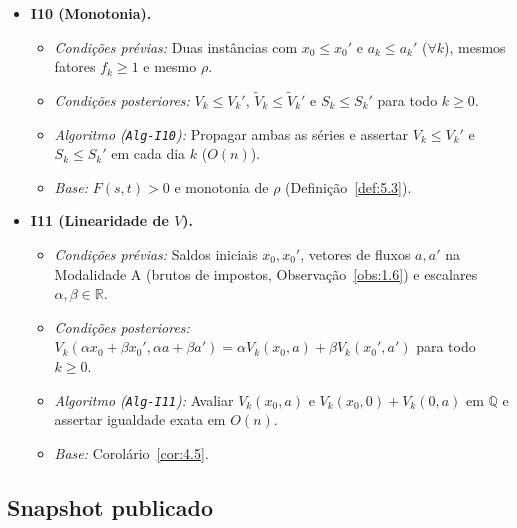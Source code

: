 \documentclass[11pt, a4paper]{article}
\theoremstyle{definition}
\theoremstyle{plain}
\theoremstyle{remark}
\begin{document}
\begin{itemize}
    \item \textbf{I10 (Monotonia).}
    \begin{itemize}
        \item \emph{Condições prévias:} Duas instâncias com $x_0 \le x_0'$ e $a_k \le a_k'$ ($\forall k$), mesmos fatores $f_k \ge 1$ e mesmo $\rho$.
        \item \emph{Condições posteriores:} $V_k \le V_k'$, $\tilde{V}_k \le \tilde{V}_k'$ e $S_k \le S_k'$ para todo $k \ge 0$.
        \item \emph{Algoritmo (\texttt{Alg-I10}):} Propagar ambas as séries e assertar $V_k \le V_k'$ e $S_k \le S_k'$ em cada dia $k$ ($O(n)$).
        \item \emph{Base:} $F(s,t) > 0$ e monotonia de $\rho$ (Definição~\ref{def:5.3}).
    \end{itemize}

    \item \textbf{I11 (Linearidade de $V$).}
    \begin{itemize}
        \item \emph{Condições prévias:} Saldos iniciais $x_0, x_0'$, vetores de fluxos $a, a'$ na Modalidade A (brutos de impostos, Observação~\ref{obs:1.6}) e escalares $\alpha, \beta \in \mathbb{R}$.
        \item \emph{Condições posteriores:} $V_k(\alpha x_0 + \beta x_0', \alpha a + \beta a') = \alpha V_k(x_0, a) + \beta V_k(x_0', a')$ para todo $k \ge 0$.
        \item \emph{Algoritmo (\texttt{Alg-I11}):} Avaliar $V_k(x_0, a)$ e $V_k(x_0, 0) + V_k(0, a)$ em $\mathbb{Q}$ e assertar igualdade exata em $O(n)$.
        \item \emph{Base:} Corolário~\ref{cor:4.5}.
    \end{itemize}
\end{itemize}

\subsection{Snapshot publicado}
\end{document}
